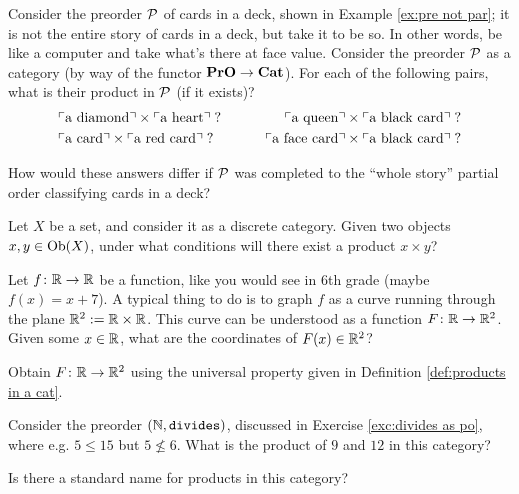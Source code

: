 \begin{exercise}
Consider the preorder $\mathcal{P}$ of cards in a deck, shown in Example \ref{ex:pre not par}; it is not the entire story of cards in a deck, but take it to be so. In other words, be like a computer and take what's there at face value. Consider the preorder $\mathcal{P}$ as a category (by way of the functor ${\bf PrO}\rightarrow{\bf Cat}$).
\sexc For each of the following pairs, what is their product in $\mathcal{P}$ (if it exists)?
\begin{align*}
&\textnormal{$\ulcorner$a diamond$\urcorner$}\times\textnormal{$\ulcorner$a heart$\urcorner$}\;? \hspace{.3in} &\textnormal{$\ulcorner$a queen$\urcorner$}\times\textnormal{$\ulcorner$a black card$\urcorner$}\;?\\
& \textnormal{$\ulcorner$a card$\urcorner$}\times\textnormal{$\ulcorner$a red card$\urcorner$}\;?\hspace{.3in}&\textnormal{$\ulcorner$a face card$\urcorner$}\times\textnormal{$\ulcorner$a black card$\urcorner$}\;?
\end{align*}
\item How would these answers differ if $\mathcal{P}$ was completed to the “whole story” partial order classifying cards in a deck?
\endsexc
\end{exercise}

\begin{exercise}
Let $X$ be a set, and consider it as a discrete category. Given two objects $x,y\in\textnormal{Ob}(X)$, under what conditions will there exist a product $x\times y$?
\end{exercise}

\begin{exercise}
Let $f\colon{\mathbb R}\rightarrow{\mathbb R}$ be a function, like you would see in 6th grade (maybe $f(x)=x+7$). A typical thing to do is to graph $f$ as a curve running through the plane ${\mathbb R}^2:={\mathbb R}\times{\mathbb R}$. This curve can be understood as a function $F\colon{\mathbb R}\rightarrow{\mathbb R}^2$.
\sexc Given some $x\in{\mathbb R}$, what are the coordinates of $F(x)\in{\mathbb R}^2$? 
\item Obtain $F\colon{\mathbb R}\rightarrow{\mathbb R}^2$ using the universal property given in Definition \ref{def:products in a cat}. 
\endsexc
\end{exercise}

\begin{exercise}
Consider the preorder $({\mathbb N},{\tt divides})$, discussed in Exercise \ref{exc:divides as po}, where e.g. $5\leq 15$ but $5\not\leq 6$. \sexc What is the product of $9$ and $12$ in this category?
\item Is there a standard name for products in this category?
\endsexc
\end{exercise}

